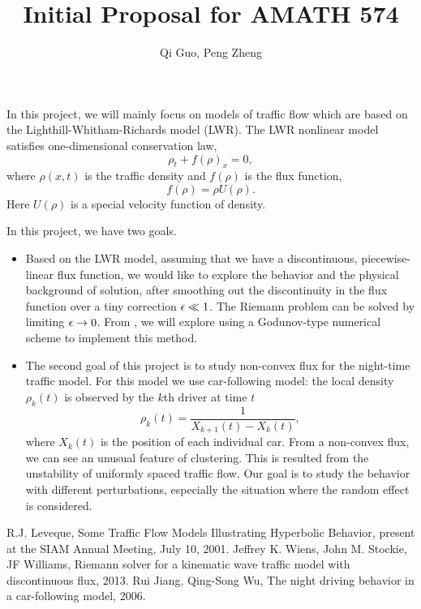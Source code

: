 \documentclass[11pt]{article}
\begin{document}
\title{\bf Initial Proposal for AMATH 574}
\author{Qi Guo, Peng Zheng}
\date{}
\maketitle

In this project, we will mainly focus on models of traffic flow which are based on the Lighthill-Whitham-Richards model (LWR). The LWR nonlinear model satisfies one-dimensional conservation law,
\[\rho_t+f(\rho)_x=0,\]
where $\rho(x,t)$ is the traffic density and $f(\rho)$ is the flux function,
\[f(\rho)=\rho U(\rho).\]
Here $U(\rho)$ is a special velocity function of density.

\vskip 8pt
In this project, we have two goals.
\begin{itemize}
\item Based on the LWR model, assuming that we have a discontinuous, piecewise-linear flux function, we would like to explore the behavior and the physical background of solution, after smoothing out the discontinuity in the flux function over a tiny correction $\epsilon\ll1$. The Riemann problem can be solved by limiting $\epsilon\rightarrow0$.
\vskip 8pt
From \cite{WS}, we will explore using a  Godunov-type numerical scheme to implement this method.
\item The second goal of this project is to study non-convex flux for the night-time traffic model. For this model we use car-following model: the local density $\rho_k(t)$ is observed by the $k$th driver at time $t$
\[\rho_k(t)=\frac{1}{X_{k+1}(t)-X_k(t)},\]
where $X_k(t)$ is the position of each individual car.
\vskip 8pt
From a non-convex flux, we can see an unusual feature of clustering. This is resulted from the unstability of uniformly spaced traffic flow. Our goal is to study the behavior with different perturbations, especially the situation where the random effect is considered.

\end{itemize}
{\footnotesize
\begin{thebibliography}{100}
 R.J. Leveque, Some Traffic Flow Models Illustrating Hyperbolic Behavior, present at the SIAM Annual Meeting, July 10, 2001.
 Jeffrey K. Wiens, John M. Stockie, JF Williams, Riemann solver for a kinematic wave traffic model with discontinuous flux, 2013.
 Rui Jiang, Qing-Song Wu, The night driving behavior in a car-following model, 2006.
\end{thebibliography}
}
\end{document}
